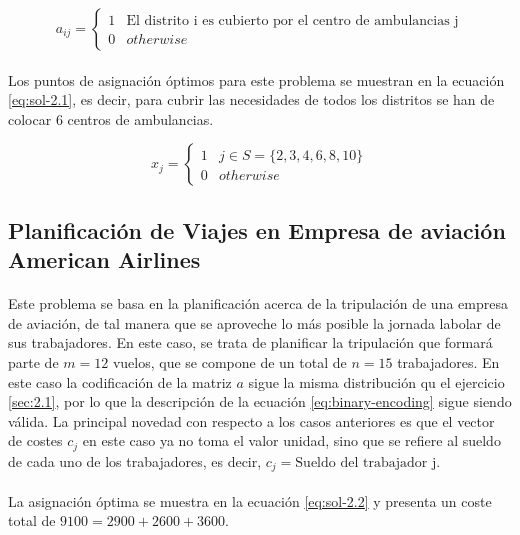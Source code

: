 \documentclass[spanish]{article}
\begin{document}
			\begin{equation}
			\label{eq:binary-encoding}
				a_{ij}  =
					\begin{cases}
		      	1 & \text{El distrito i es cubierto por el centro de ambulancias j}\\
		      	0 & otherwise
			   	\end{cases}
			\end{equation}

			\paragraph{}
			Los puntos de asignación óptimos para este problema se muestran en la ecuación \eqref{eq:sol-2.1}, es decir, para cubrir las necesidades de todos los distritos se han de colocar $6$ centros de ambulancias.

			\begin{equation}
			\label{eq:sol-2.1}
				x_{j} =
					\begin{cases}
		      	1 & j \in S = \{2,  3,  4,  6,  8,  10 \} \\
		      	0 & otherwise
			   	\end{cases}
			\end{equation}


		\subsection{Planificación de Viajes en Empresa de aviación American Airlines}
		\label{sec:2.2}

			\paragraph{}
			Este problema se basa en la planificación acerca de la tripulación de una empresa de aviación, de tal manera que se aproveche lo más posible la jornada labolar de sus trabajadores. En este caso, se trata de planificar la tripulación que formará parte de $m = 12$ vuelos, que se compone de un total de $n = 15$ trabajadores. En este caso la codificación de la matriz $a$ sigue la misma distribución qu el ejercicio \ref{sec:2.1}, por lo que la descripción de la ecuación \eqref{eq:binary-encoding} sigue siendo válida. La principal novedad con respecto a los casos anteriores es que el vector de costes $c_j$ en este caso ya no toma el valor unidad, sino que se refiere al sueldo de cada uno de los trabajadores, es decir, $c_j = \text{Sueldo del trabajador j}$.

			\paragraph{}
			La asignación óptima se muestra en la ecuación \eqref{eq:sol-2.2} y presenta un coste total de $9100 = 2900 + 2600 + 3600$.
\end{document}
